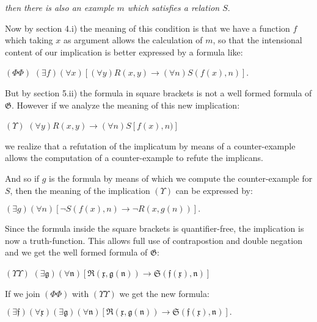 \documentclass[12pt]{article}
\begin{document}
\begin{enumerate}
\begin{center}
\emph{then there is also an example $m$ which satisfies a relation $S.$}
\end{center}

Now by section 4.i) the meaning of this condition is that we have a function $f$ which taking $x$ as argument allows the calculation of $m$, so that the intensional content of our implication is better expressed by a formula like:

\begin{center}
$(\Phi \Phi)$ \qquad \qquad $(\exists f) (\forall x) [(\forall y) R (x, y) \rightarrow (\forall n) S (f (x), n)].$
\end{center}

But by section 5.ii) the formula in square brackets is not a well formed formula of $\mathfrak{G}$. However if we analyze the meaning of this new implication:

\begin{center}
$(\Upsilon)$ \qquad \qquad $(\forall y) R (x, y) \rightarrow (\forall n) S [f (x), n)]$
\end{center}

we realize that a refutation of the implicatum by means of a counter-example allows the computation of a counter-example to refute the implicans.

And so if $g$ is the formula by means of which we compute the counter-example for $S$, then the meaning of the implication $(\Upsilon)$ can be expressed by:

\begin{center} 
$(\exists g) (\forall n) [\neg S (f (x), n) \rightarrow \neg R (x, g (n))].$
\end{center}

Since the formula inside the square brackets is quantifier-free, the implication is now a truth-function. This allows full use of contrapostion and double negation and we get the well formed formula of $\mathfrak{G}$:

\begin{center} 
$(\Upsilon \Upsilon)$ \qquad \qquad $(\exists \mathfrak{g}) (\forall \mathfrak{n}) [\mathfrak{R} (\mathfrak{x}, \mathfrak{g} (\mathfrak{n})) \rightarrow \mathfrak{S} (\mathfrak{f} (\mathfrak{x}), \mathfrak{n})]$
\end{center} 

If we join $(\Phi \Phi)$ with $(\Upsilon \Upsilon)$ we get the new formula:

\begin{center}
$(\exists \mathfrak{f}) (\forall \mathfrak{x}) (\exists \mathfrak{g}) (\forall \mathfrak{n}) [\mathfrak{R} (\mathfrak{x}, \mathfrak{g} (\mathfrak{n})) \rightarrow \mathfrak{S} (\mathfrak{f} (\mathfrak{x}), \mathfrak{n})].$
\end{center}


\end{enumerate}
\end{document}
